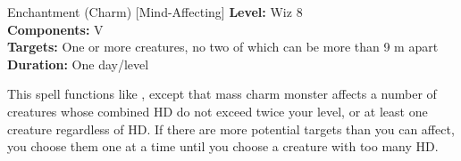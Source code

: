 {Enchantment (Charm) [Mind-Affecting]}
{
	\textbf{Level:}
	Wiz 8\\
	\textbf{Components:}
	V\\
	\textbf{Targets:}
	One or more creatures, no two of which can be more than 9 m apart\\
	\textbf{Duration:}
	One day/level\\
}
{
	This spell functions like , except that mass charm monster affects a number of creatures whose combined HD do not exceed twice your level, or at least one creature regardless of HD. If there are more potential targets than you can affect, you choose them one at a time until you choose a creature with too many HD.

}
